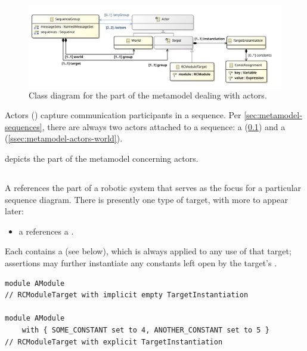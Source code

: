 \begin{figure}[htb]
	\centering
	\includegraphics[width=\textwidth]{diagrams/Actors}
	\caption{Class diagram for the part of the \langname{} metamodel dealing with actors.}
	\label{fig:metamodel-actors}
\end{figure}

\noindent
Actors (\mactor{}) capture communication participants in a sequence.
Per \cref{sec:metamodel-sequences}, there are always two actors
attached to a sequence: a \mtarget{} (\cref{ssec:metamodel-actors-target})
and a \mworld{} (\cref{ssec:metamodel-actors-world}).

 depicts the part of the metamodel concerning
actors.

\subsection{\mtarget}\label{ssec:metamodel-actors-target}

A \mtarget{} references the part of a robotic system that serves as the focus
for a particular sequence diagram.  There is
presently one type of target, with more to appear later:

\begin{itemize}
\item
	a \mrcmoduletarget{} references a \mrcmodule.
\end{itemize}

Each \mtarget{} contains a \mtargetinstantiation{} (see below), which
is always applied to any use of that target; assertions may further instantiate
any constants left open by the target's \mtargetinstantiation.

\begin{lstlisting}[style=Example]
module AModule
// RCModuleTarget with implicit empty TargetInstantiation

module AModule
    with { SOME_CONSTANT set to 4, ANOTHER_CONSTANT set to 5 }
// RCModuleTarget with explicit TargetInstantiation
\end{lstlisting}

